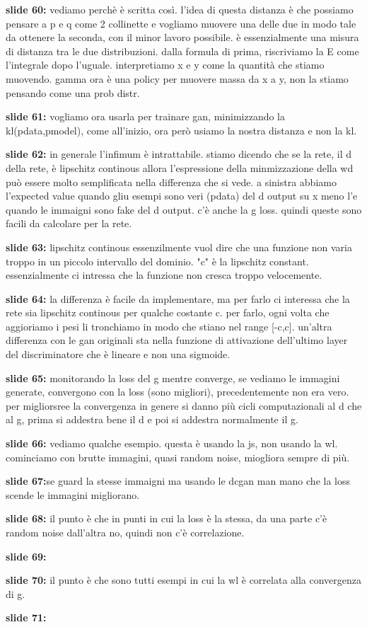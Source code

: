 \textbf{slide 60:} vediamo perchè è scritta così. l'idea di questa distanza è che possiamo pensare a p e q 
come 2 collinette e vogliamo muovere una delle due in modo tale da ottenere la seconda, con il minor 
lavoro possibile. è essenzialmente una misura di distanza tra le due distribuzioni. 
dalla formula di prima, riscriviamo la E come l'integrale dopo l'uguale. interpretiamo x e y come la quantità
che stiamo muovendo. gamma ora è una policy per muovere massa da x a y, non la stiamo pensando come una prob
distr. 

\textbf{slide 61:} vogliamo ora usarla per trainare gan, minimizzando la kl(pdata,pmodel), come all'inizio,
ora però usiamo la nostra distanza e non la kl. 

\textbf{slide 62:} in generale l'infimum è intrattabile. stiamo dicendo che se la rete, il d della rete, è
lipschitz continous allora l'espressione della minmizzazione della wd può essere molto semplificata nella 
differenza che si vede. a sinistra abbiamo l'expected value quando gliu esempi sono veri (pdata) del d output
su x meno l'e quando le immaigni sono fake del d output. c'è anche la g loss. quindi queste sono facili da
calcolare per la rete.

\textbf{slide 63:} lipschitz continous essenzilmente vuol dire che una funzione non varia troppo in un 
piccolo intervallo del dominio. "c" è la lipschitz constant. essenzialmente ci intressa che la funzione non
cresca troppo velocemente.

\textbf{slide 64:} la differenza è facile da implementare, ma per farlo ci interessa che la rete sia 
lipschitz continous per qualche costante c. per farlo, ogni volta che aggioriamo i pesi li tronchiamo in modo
che stiano nel range [-c,c]. un'altra differenza con le gan originali sta nella funzione di attivazione
dell'ultimo layer del discriminatore che è lineare e non una sigmoide.  

\textbf{slide 65:} monitorando la loss del g mentre converge, se vediamo le immagini generate, convergono con
la loss (sono migliori), precedentemente non era vero. per migliorsree la convergenza in genere si danno
più cicli computazionali al d che al g, prima si addestra bene il d e poi si addestra normalmente il g.

\textbf{slide 66:} vediamo qualche esempio. questa è usando la js, non usando la wl. cominciamo con brutte 
immagini, quasi random noise, miogliora sempre di più.

\textbf{slide 67:}se guard la stesse immaigni ma usando le dcgan man mano che la loss scende le immagini
migliorano.

\textbf{slide 68:} il punto è che in punti in cui la loss è la stessa, da una parte c'è random noise 
dall'altra no, quindi non c'è correlazione.

\textbf{slide 69:}

\textbf{slide 70:} il punto è che sono tutti esempi in cui la wl è correlata alla convergenza di g. 

\textbf{slide 71:}